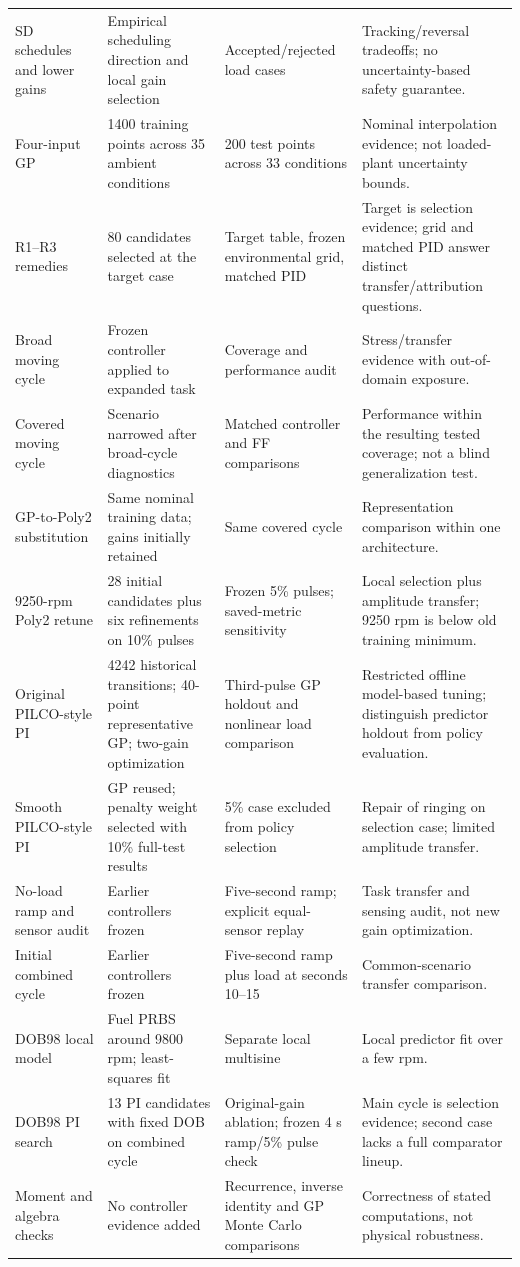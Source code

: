 \begin{longtable}{@{}p{.19\linewidth}p{.27\linewidth}p{.23\linewidth}p{.23\linewidth}@{}}
SD schedules and lower gains & Empirical scheduling direction and local gain selection & Accepted/rejected load cases & Tracking/reversal tradeoffs; no uncertainty-based safety guarantee.\\
Four-input GP & 1400 training points across 35 ambient conditions & 200 test points across 33 conditions & Nominal interpolation evidence; not loaded-plant uncertainty bounds.\\
R1--R3 remedies & 80 candidates selected at the target case & Target table, frozen environmental grid, matched PID & Target is selection evidence; grid and matched PID answer distinct transfer/attribution questions.\\
Broad moving cycle & Frozen controller applied to expanded task & Coverage and performance audit & Stress/transfer evidence with out-of-domain exposure.\\
Covered moving cycle & Scenario narrowed after broad-cycle diagnostics & Matched controller and FF comparisons & Performance within the resulting tested coverage; not a blind generalization test.\\
GP-to-Poly2 substitution & Same nominal training data; gains initially retained & Same covered cycle & Representation comparison within one architecture.\\
9250-rpm Poly2 retune & 28 initial candidates plus six refinements on 10\% pulses & Frozen 5\% pulses; saved-metric sensitivity & Local selection plus amplitude transfer; 9250 rpm is below old training minimum.\\
Original PILCO-style PI & 4242 historical transitions; 40-point representative GP; two-gain optimization & Third-pulse GP holdout and nonlinear load comparison & Restricted offline model-based tuning; distinguish predictor holdout from policy evaluation.\\
Smooth PILCO-style PI & GP reused; penalty weight selected with 10\% full-test results & 5\% case excluded from policy selection & Repair of ringing on selection case; limited amplitude transfer.\\
No-load ramp and sensor audit & Earlier controllers frozen & Five-second ramp; explicit equal-sensor replay & Task transfer and sensing audit, not new gain optimization.\\
Initial combined cycle & Earlier controllers frozen & Five-second ramp plus load at seconds 10--15 & Common-scenario transfer comparison.\\
DOB98 local model & Fuel PRBS around 9800 rpm; least-squares fit & Separate local multisine & Local predictor fit over a few rpm.\\
DOB98 PI search & 13 PI candidates with fixed DOB on combined cycle & Original-gain ablation; frozen 4 s ramp/5\% pulse check & Main cycle is selection evidence; second case lacks a full comparator lineup.\\
Moment and algebra checks & No controller evidence added & Recurrence, inverse identity and GP Monte Carlo comparisons & Correctness of stated computations, not physical robustness.\\\bottomrule
\end{longtable}
\normalsize

